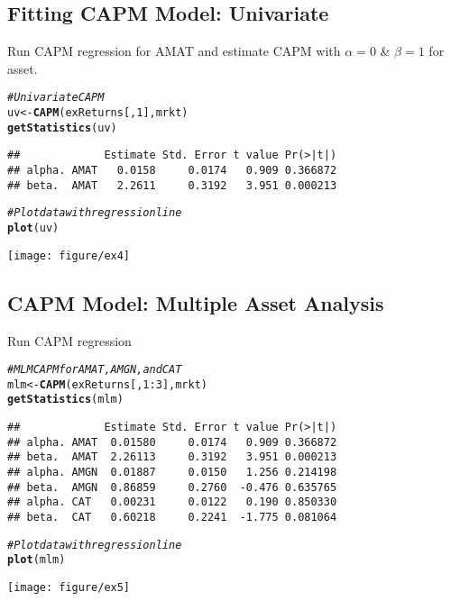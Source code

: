 \documentclass[a4paper]{article}\usepackage[]{graphicx}\usepackage[]{color}
\makeatletter
\def\maxwidth{ %
  \ifdim\Gin@nat@width>\linewidth
    \linewidth
  \else
    \Gin@nat@width
  \fi
}
\newcommand{\hlnum}[1]{\textcolor[rgb]{0.686,0.059,0.569}{#1}}%
\newcommand{\hlcom}[1]{\textcolor[rgb]{0.678,0.584,0.686}{\textit{#1}}}%
\newcommand{\hlopt}[1]{\textcolor[rgb]{0,0,0}{#1}}%
\newcommand{\hlstd}[1]{\textcolor[rgb]{0.345,0.345,0.345}{#1}}%
\newcommand{\hlkwb}[1]{\textcolor[rgb]{0.69,0.353,0.396}{#1}}%
\newcommand{\hlkwd}[1]{\textcolor[rgb]{0.737,0.353,0.396}{\textbf{#1}}}%
\newenvironment{kframe}{%
 \def\at@end@of@kframe{}%
 \ifinner\ifhmode%
  \def\at@end@of@kframe{\end{minipage}}%
  \begin{minipage}{\columnwidth}%
 \fi\fi%
 \def\FrameCommand##1{\hskip\@totalleftmargin \hskip-\fboxsep
 \colorbox{shadecolor}{##1}\hskip-\fboxsep
     \hskip-\linewidth \hskip-\@totalleftmargin \hskip\columnwidth}%
 \MakeFramed {\advance\hsize-\width
   \@totalleftmargin\z@ \linewidth\hsize
   \@setminipage}}%
 {\par\unskip\endMakeFramed%
 \at@end@of@kframe}
\newenvironment{knitrout}{}{} %
\makeatother
\begin{document}
\subsection{Fitting CAPM Model: Univariate}
Run CAPM regression for AMAT and estimate CAPM with $\alpha=0$ \& $\beta=1$ for asset.
\begin{knitrout}
\color{fgcolor}\begin{kframe}
\begin{alltt}
\hlcom{# Univariate CAPM}
\hlstd{uv} \hlkwb{<-} \hlkwd{CAPM}\hlstd{(exReturns[,} \hlnum{1}\hlstd{], mrkt)}
\hlkwd{getStatistics}\hlstd{(uv)}
\end{alltt}
\begin{verbatim}
##             Estimate Std. Error t value Pr(>|t|)
## alpha. AMAT   0.0158     0.0174   0.909 0.366872
## beta.  AMAT   2.2611     0.3192   3.951 0.000213
\end{verbatim}
\begin{alltt}
\hlcom{# Plot data with regression line}
\hlkwd{plot}\hlstd{(uv)}
\end{alltt}
\end{kframe}
\texttt{[image: figure/ex4]} 

\end{knitrout}

\subsection{CAPM Model: Multiple Asset Analysis}
Run CAPM regression
\begin{knitrout}
\color{fgcolor}\begin{kframe}
\begin{alltt}
\hlcom{# MLM CAPM for AMAT, AMGN, and CAT}
\hlstd{mlm} \hlkwb{<-} \hlkwd{CAPM}\hlstd{(exReturns[,} \hlnum{1}\hlopt{:}\hlnum{3}\hlstd{], mrkt)}
\hlkwd{getStatistics}\hlstd{(mlm)}
\end{alltt}
\begin{verbatim}
##             Estimate Std. Error t value Pr(>|t|)
## alpha. AMAT  0.01580     0.0174   0.909 0.366872
## beta.  AMAT  2.26113     0.3192   3.951 0.000213
## alpha. AMGN  0.01887     0.0150   1.256 0.214198
## beta.  AMGN  0.86859     0.2760  -0.476 0.635765
## alpha. CAT   0.00231     0.0122   0.190 0.850330
## beta.  CAT   0.60218     0.2241  -1.775 0.081064
\end{verbatim}
\begin{alltt}
\hlcom{# Plot data with regression line}
\hlkwd{plot}\hlstd{(mlm)}
\end{alltt}
\end{kframe}
\texttt{[image: figure/ex5]} 

\end{knitrout}
\end{document}
